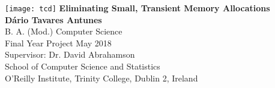 \begin{titlepage}
	\begin{center}
		\vspace*{-2cm}
		\texttt{[image: tcd]}
		\vfill
		\textbf{\LARGE Eliminating Small, Transient Memory Allocations}\\
		\large
		\vspace{1.5cm}
		\textbf{D\'ario Tavares Antunes} \\
		B. A. (Mod.) Computer Science \\
		Final Year Project May 2018 \\
		Supervisor: Dr. David Abrahamson\\
		\vfill
		\Large
		School of Computer Science and Statistics \\
		O'Reilly Institute, Trinity College, Dublin 2, Ireland
	\end{center}
\end{titlepage}
